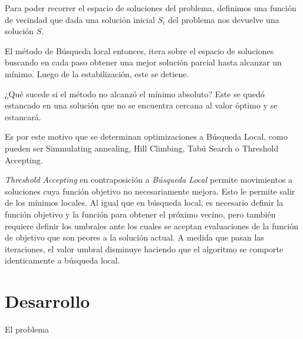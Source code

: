 \documentclass[a4paper,spanish]{article}
\begin{document}
Para poder recorrer el espacio de soluciones del problema, definimos una función
de vecindad que dada una solución inicial $S_i$ del problema nos devuelve una
solución $S$.


El método de Búsqueda local entonces, itera sobre el espacio de soluciones
buscando en cada paso obtener una mejor solución parcial hasta alcanzar un
mínimo. Luego de la estabilización, este se detiene.

¿Qué sucede si el método no alcanzó el mínimo absoluto? Este se quedó estancado
en una solución que no se encuentra cercana al valor óptimo y se estancará.

Es por este motivo que se determinan optimizaciones a Búsqueda Local, como
pueden ser Simmulating annealing, Hill Climbing, Tabú Search o Threshold
Accepting.

\emph{Threshold Accepting} en contraposición a \emph{Búsqueda Local} permite
movimientos a soluciones cuya función objetivo no necesariamente mejora. Esto le
permite salir de los mínimos locales. Al igual que en búsqueda local, es
necesario definir la función objetivo y la función para obtener el próximo
vecino, pero también requiere definir los umbrales ante los cuales se aceptan
evaluaciones de la función de objetivo que son peores a la solución actual.
A medida que pasan las iteraciones, el valor umbral disminuye haciendo que el
algoritmo se comporte identicamente a búsqueda local.


\section{Desarrollo}

El problema 


\end{document}
